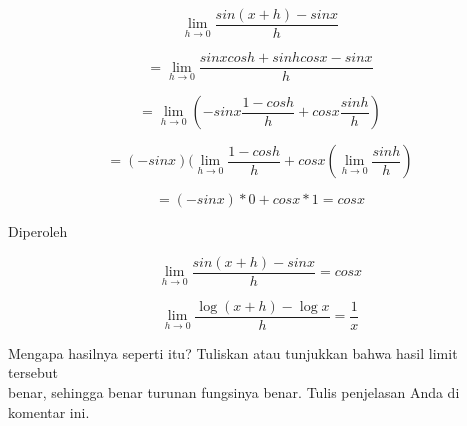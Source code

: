 \documentclass{article}
\begin{document}
\begin{eulernotebook}
\begin{eulercomment}
\begin{eulercomment}
\begin{eulercomment}
\end{eulercomment}
\begin{eulercomment}
\end{eulercomment}
\begin{eulerformula}
\[
\lim_{h\to 0} \frac{sin(x+h)-sinx}{h}
\]
\end{eulerformula}
\begin{eulercomment}
\end{eulercomment}
\begin{eulerformula}
\[
= \lim_{h\to 0} \frac{sinxcosh+sinhcosx-sinx}{h}
\]
\end{eulerformula}
\begin{eulercomment}
\end{eulercomment}
\begin{eulerformula}
\[
= \lim_{h\to 0} (-sinx \frac{1-cosh}{h} + cosx \frac{sinh}{h})
\]
\end{eulerformula}
\begin{eulercomment}
\end{eulercomment}
\begin{eulerformula}
\[
= (-sinx)( \lim_{h\to 0} \frac{1-cosh}{h} + cosx (\lim_{h\to 0}\frac{sinh}{h})
\]
\end{eulerformula}
\begin{eulercomment}
\end{eulercomment}
\begin{eulerformula}
\[
= (-sinx) * 0 + cosx * 1 = cosx
\]
\end{eulerformula}
\begin{eulercomment}
Diperoleh

\end{eulercomment}
\begin{eulerformula}
\[
\lim_{h\to 0} \frac{sin(x+h)-sinx}{h} = cosx
\]
\end{eulerformula}
\begin{eulercomment}
\end{eulercomment}
\eulersubheading{}
\begin{eulerformula}
\[
\lim_{h\rightarrow 0}{\frac{\log \left(x+h\right)-\log x}{h}}=  \frac{1}{x}
\]
\end{eulerformula}
\begin{eulercomment}
Mengapa hasilnya seperti itu? Tuliskan atau tunjukkan bahwa hasil
limit tersebut\\
benar, sehingga benar turunan fungsinya benar.  Tulis penjelasan Anda
di komentar ini.


\end{eulercomment}
\end{eulercomment}
\end{eulercomment}
\end{eulernotebook}
\end{document}
